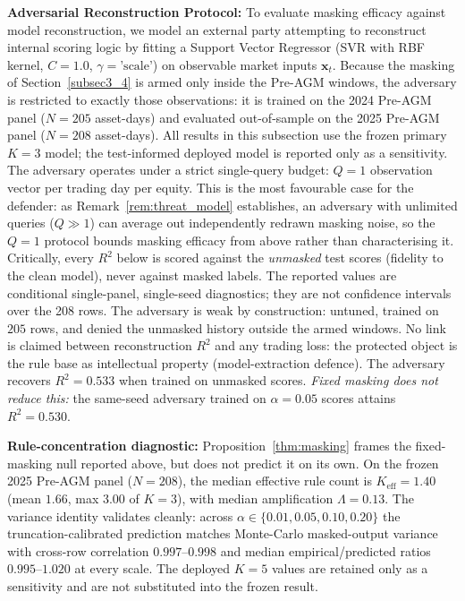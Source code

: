 \documentclass[pdflatex,sn-mathphys-num]{sn-jnl}
\theoremstyle{thmstyleone}
\theoremstyle{thmstyletwo}
\theoremstyle{thmstylethree}
\begin{document}
\noindent\textbf{Adversarial Reconstruction Protocol:} To evaluate masking efficacy against model reconstruction, we model an external party attempting to reconstruct internal scoring logic by fitting a Support Vector Regressor (SVR with RBF kernel, $C=1.0$, $\gamma=\text{'scale'}$) on observable market inputs $\mathbf{x}_t$. Because the masking of Section~\ref{subsec3_4} is armed only inside the Pre-AGM windows, the adversary is restricted to exactly those observations: it is trained on the 2024 Pre-AGM panel ($N = 205$ asset-days) and evaluated out-of-sample on the 2025 Pre-AGM panel ($N = 208$ asset-days). All results in this subsection use the frozen primary $K=3$ model; the test-informed deployed model is reported only as a sensitivity. The adversary operates under a strict single-query budget: $Q = 1$ observation vector per trading day per equity. This is the most favourable case for the defender: as Remark~\ref{rem:threat_model} establishes, an adversary with unlimited queries ($Q \gg 1$) can average out independently redrawn masking noise, so the $Q=1$ protocol bounds masking efficacy from above rather than characterising it. Critically, every $R^2$ below is scored against the \emph{unmasked} test scores (fidelity to the clean model), never against masked labels. The reported values are conditional single-panel, single-seed diagnostics; they are not confidence intervals over the 208 rows. The adversary is weak by construction: untuned, trained on $205$ rows, and denied the unmasked history outside the armed windows. No link is claimed between reconstruction $R^2$ and any trading loss: the protected object is the rule base as intellectual property (model-extraction defence). The adversary recovers $R^2 = 0.533$ when trained on unmasked scores. \emph{Fixed masking does not reduce this:} the same-seed adversary trained on $\alpha=0.05$ scores attains $R^2=0.530$.

\noindent\textbf{Rule-concentration diagnostic:} Proposition~\ref{thm:masking} frames the fixed-masking null reported above, but does not predict it on its own. On the frozen 2025 Pre-AGM panel ($N=208$), the median effective rule count is $K_{\mathrm{eff}}=1.40$ (mean $1.66$, max $3.00$ of $K=3$), with median amplification $\Lambda=0.13$. The variance identity validates cleanly: across $\alpha \in \{0.01,0.05,0.10,0.20\}$ the truncation-calibrated prediction matches Monte-Carlo masked-output variance with cross-row correlation $0.997$--$0.998$ and median empirical/predicted ratios $0.995$--$1.020$ at every scale. The deployed $K=5$ values are retained only as a sensitivity and are not substituted into the frozen result.
\end{document}
